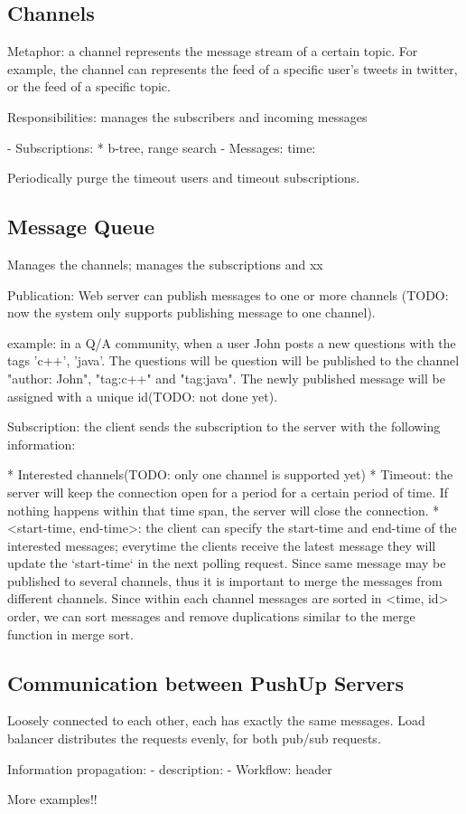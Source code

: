 \subsection{Channels\\}

Metaphor: a channel represents the message stream of a certain topic. For example, the channel can represents the feed of a specific user's tweets in twitter, or the feed of a specific topic.

Responsibilities: manages the subscribers and incoming messages

- Subscriptions: 
    * b-tree, range search
    - Messages: time: 

Periodically purge the timeout users and timeout subscriptions.

\subsection{Message Queue\\}

Manages the channels; manages the subscriptions and xx

Publication: Web server can publish messages to one or more channels (TODO: now the system only supports publishing message to one channel).

    example: in a Q/A community, when a user John posts a new questions with the tags 'c++', 'java'. The questions will be  question will be published to the channel "author: John", "tag:c++" and "tag:java". The newly published message will be assigned with a unique id(TODO: not done yet).

    Subscription: the client sends the subscription to the server with the following information:

    * Interested channels(TODO: only one channel is supported yet)
    * Timeout: the server will keep the connection open for a period for a certain period of time. If nothing happens within that time span, the server will close the connection.
    * <start-time, end-time>: the client can specify the start-time and end-time of the interested messages; everytime the clients receive the latest message they will update the `start-time` in the  next polling request.
    Since same message may be published to several channels, thus it is important to merge the messages from different channels. Since within each channel messages are sorted in <time, id> order, we  can sort messages and remove duplications similar to the merge function in merge sort.

\subsection{Communication between PushUp Servers\\}

Loosely connected to each other, each has exactly the same messages.
Load balancer distributes the requests evenly, for both pub/sub requests.

Information propagation: 
- description:
- Workflow: header

More examples!!

